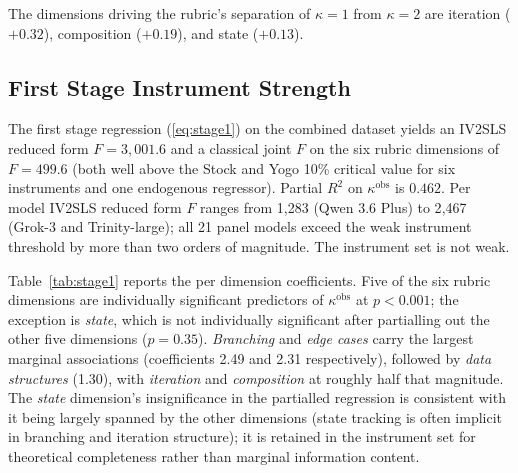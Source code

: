 \documentclass[conference]{IEEEtran}
\begin{document}
The dimensions driving the rubric's separation of $\kappa=1$ from $\kappa=2$ are iteration ($+0.32$), composition ($+0.19$), and state ($+0.13$).

\subsection{First Stage Instrument Strength}

The first stage regression (\ref{eq:stage1}) on the combined dataset yields an IV2SLS reduced form $F=3{,}001.6$ and a classical joint $F$ on the six rubric dimensions of $F=499.6$ (both well above the Stock and Yogo 10\% critical value for six instruments and one endogenous regressor). Partial $R^2$ on $\kappa^{\text{obs}}$ is $0.462$. Per model IV2SLS reduced form $F$ ranges from 1{,}283 (Qwen 3.6 Plus) to 2{,}467 (Grok-3 and Trinity-large); all 21 panel models exceed the weak instrument threshold by more than two orders of magnitude. The instrument set is not weak.

Table~\ref{tab:stage1} reports the per dimension coefficients. Five of the six rubric dimensions are individually significant predictors of $\kappa^{\text{obs}}$ at $p<0.001$; the exception is \emph{state}, which is not individually significant after partialling out the other five dimensions ($p=0.35$). \emph{Branching} and \emph{edge cases} carry the largest marginal associations (coefficients 2.49 and 2.31 respectively), followed by \emph{data structures} (1.30), with \emph{iteration} and \emph{composition} at roughly half that magnitude. The \emph{state} dimension's insignificance in the partialled regression is consistent with it being largely spanned by the other dimensions (state tracking is often implicit in branching and iteration structure); it is retained in the instrument set for theoretical completeness rather than marginal information content.
\end{document}
